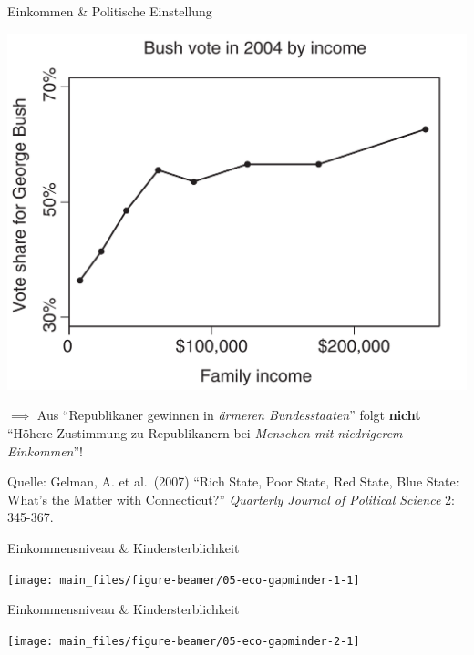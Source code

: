 \documentclass[
  10pt,
  ignorenonframetext,
]{beamer}
\begin{document}
\begin{frame}{Einkommen \& Politische Einstellung}
\label{einkommen-politische-einstellung-1}
\begin{center}
\includegraphics[height=.6\textheight]{pics/5-presidential2004-income.png}
\end{center}

\(\implies\) Aus ``Republikaner gewinnen in \emph{ärmeren
Bundesstaaten}'' folgt \textbf{nicht} ``Höhere Zustimmung zu
Republikanern bei \emph{Menschen mit niedrigerem Einkommen}''!

\scriptsize

Quelle: Gelman, A. et al.~(2007) ``Rich State, Poor State, Red State,
Blue State: What's the Matter with Connecticut?'' \emph{Quarterly
Journal of Political Science} 2: 345-367. \normalsize
\end{frame}

\begin{frame}{Einkommensniveau \& Kindersterblichkeit}
\label{einkommensniveau-kindersterblichkeit}
\scriptsize\normalsize

\scriptsize

\begin{center}\texttt{[image: main\_files/figure-beamer/05-eco-gapminder-1-1]} \end{center}

\normalsize
\end{frame}

\begin{frame}{Einkommensniveau \& Kindersterblichkeit}
\label{einkommensniveau-kindersterblichkeit-1}
\scriptsize

\begin{center}\texttt{[image: main\_files/figure-beamer/05-eco-gapminder-2-1]} \end{center}

\normalsize
\end{frame}
\end{document}
